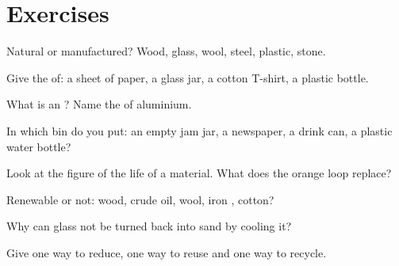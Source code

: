 \section{Exercises}

\begin{exercise}[$\star$]\label{exo:g5:raw-materials-and-recycling:1}
Natural or manufactured? Wood, glass, wool, steel, plastic, stone.
\end{exercise}

\begin{exercise}[$\star$]\label{exo:g5:raw-materials-and-recycling:2}
Give the  of: a sheet of paper, a glass jar, a cotton
T-shirt, a plastic bottle.
\end{exercise}

\begin{exercise}[$\star$]\label{exo:g5:raw-materials-and-recycling:3}
What is an ? Name the  of aluminium.
\end{exercise}

\begin{exercise}[$\star$]\label{exo:g5:raw-materials-and-recycling:4}
In which bin do you put: an empty jam jar, a newspaper, a drink can, a
plastic water bottle?
\end{exercise}

\begin{exercise}[$\star$]\label{exo:g5:raw-materials-and-recycling:5}
Look at the figure of the life of a material. What does the orange loop
replace?
\end{exercise}

\begin{exercise}[$\star$]\label{exo:g5:raw-materials-and-recycling:6}
Renewable or not: wood, crude oil, wool, iron , cotton?
\end{exercise}

\begin{exercise}[$\star$]\label{exo:g5:raw-materials-and-recycling:7}
Why can glass not be turned back into sand by cooling it?
\end{exercise}

\begin{exercise}[$\star$]\label{exo:g5:raw-materials-and-recycling:8}
Give one way to reduce, one way to reuse and one way to recycle.
\end{exercise}

